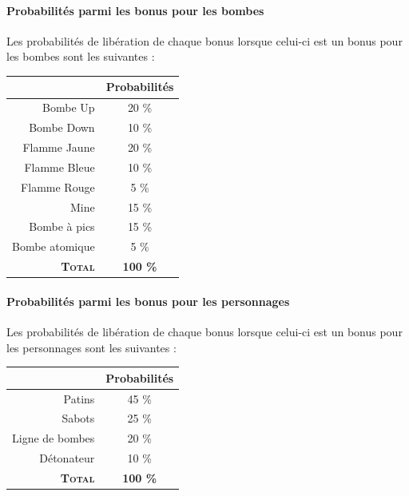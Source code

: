 \paragraph{Probabilités parmi les bonus pour les bombes}
Les probabilités de libération de chaque bonus lorsque celui-ci est un bonus pour les bombes sont les suivantes :\begin{center}
\begin{tabular}{|r|c|}
\hline 
& Probabilités \\ 
\hline 
Bombe Up & 20 \% \\ 
\hline 
Bombe Down & 10 \% \\ 
\hline 
Flamme Jaune & 20 \% \\ 
\hline 
Flamme Bleue & 10 \% \\ 
\hline 
Flamme Rouge & 5 \% \\ 
\hline 
Mine & 15 \% \\ 
\hline 
Bombe à pics & 15 \% \\ 
\hline 
Bombe atomique & 5 \% \\ 
\hline 
\textbf{\textsc{Total}} & \textbf{100 \%} \\ 
\hline 
\end{tabular} 
\end{center}

\paragraph{Probabilités parmi les bonus pour les personnages}
Les probabilités de libération de chaque bonus lorsque celui-ci est un bonus pour les personnages sont les suivantes :\begin{center}
\begin{tabular}{|r|c|}
\hline 
& Probabilités \\ 
\hline 
Patins & 45 \% \\ 
\hline 
Sabots & 25 \% \\ 
\hline 
Ligne de bombes & 20 \% \\ 
\hline 
Détonateur & 10 \% \\ 
\hline 
\textbf{\textsc{Total}} & \textbf{100 \%} \\ 
\hline 
\end{tabular} 
\end{center}

